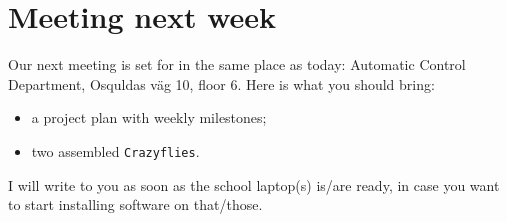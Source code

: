 \section*{Meeting next week}

Our next meeting is set for  in the same place as today: Automatic Control Department, Osquldas v\"ag 10, floor 6. Here is what you should bring:

\begin{itemize}
 \item a project plan with weekly milestones;
 \item two assembled \texttt{Crazyflies}.
\end{itemize}

I will write to you as soon as the school laptop(s) is/are ready, in case you want to start installing software on that/those.
